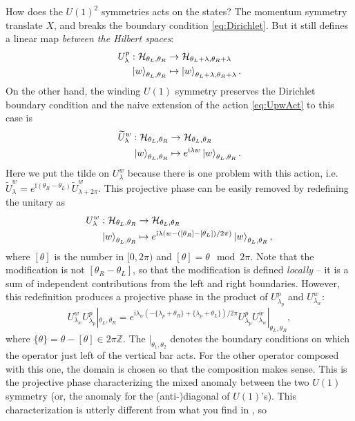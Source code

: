\documentclass[
]{scrartcl}
\numberwithin{equation}{section}
\renewenvironment{align}{\begin{equation}\begin{aligned}}{\end{aligned}\end{equation}}
\theoremstyle{definition}
\theoremstyle{definition}
\theoremstyle{definition}
\theoremstyle{definition}
\theoremstyle{remark}
\begin{document}
How does the \(U(1)^2\) symmetries acts on the states?
The momentum symmetry translate \(X\), and breaks the boundary condition \eqref{eq:Dirichlet}.
But it still defines a linear map \emph{between the Hilbert spaces}:
\begin{align}
    \label{eq:UpactDirichlet}
    U^p_\lambda : \mathcal{H}_{\theta_L,\theta_R} &\to \mathcal{H}_{\theta_L+\lambda,\theta_R+\lambda}\\
    \ket{w}_{\theta_L,\theta_R} &\mapsto \ket{w}_{\theta_L+\lambda,\theta_R+\lambda}.
\end{align}
On the other hand, the winding \(U(1)\) symmetry preserves the Dirichlet boundary condition and the naive extension of the action \eqref{eq:UpwAct} to this case is
\begin{align}
    \label{eq:tildeUwactDirichlet}
    \widetilde{U}^w_\lambda : \mathcal{H}_{\theta_L,\theta_R} &\to \mathcal{H}_{\theta_L,\theta_R}\\
    \ket{w}_{\theta_L,\theta_R} &\mapsto e^{\mathrm{i}\lambda w}\ket{w}_{\theta_L,\theta_R}.
\end{align}
Here we put the tilde on \(U^w_\lambda\) because there is one problem with this action, i.e.~\(\widetilde{U}^w_\lambda = e^{\mathrm{i}(\theta_R-\theta_L)}\widetilde{U}^w_{\lambda+2\pi}\).
This projective phase can be easily removed by redefining the unitary as
\begin{align}
    \label{eq:UwactDirichlet}
    U^w_\lambda : \mathcal{H}_{\theta_L,\theta_R} &\to \mathcal{H}_{\theta_L,\theta_R}\\
    \ket{w}_{\theta_L,\theta_R} &\mapsto e^{\mathrm{i}\lambda (w-([\theta_R]-[\theta_L])/2\pi)}\ket{w}_{\theta_L,\theta_R},
\end{align}
where \([\theta]\) is the number in \([0,2\pi)\) and \([\theta] = \theta \mod 2\pi\). Note that the modification is not \([\theta_R-\theta_L]\), so that the modification is defined \emph{locally} -- it is a sum of independent contributions from the left and right boundaries.
However, this redefinition produces a projective phase in the product of \(U^p_{\lambda_p}\) and \(U^w_{\lambda_w}\):
\begin{equation}
    \label{eq:UpUwcomu}
    U^w_{\lambda_w}U^p_{\lambda_p}|_{\theta_L,\theta_R} = e^{\mathrm{i}\lambda_w(-\{\lambda_p+\theta_R\} + \{\lambda_p+\theta_L\})/2\pi} U^p_{\lambda_p}U^w_{\lambda_w}|_{\theta_L,\theta_R},
\end{equation}
where \(\{\theta\} = \theta - [\theta] \in 2\pi \mathbb{Z}\).
The \(|_{\theta_1,\theta_2}\) denotes the boundary conditions on which the operator just left of the vertical bar acts. For the other operator composed with this one, the domain is chosen so that the composition makes sense.
This is the projective phase characterizing the mixed anomaly between the two \(U(1)\) symmetry (or, the anomaly for the (anti-)diagonal of \(U(1)\)'s).
This characterization is utterly different from what you find in \textcite{PolchinskiVol1}, so
\end{document}
